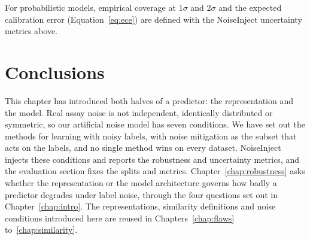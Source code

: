 For probabilistic models, empirical coverage at $1\sigma$ and $2\sigma$ and the expected calibration error (Equation~\ref{eq:ece}) are defined with the NoiseInject uncertainty metrics above.

\section{Conclusions}


This chapter has introduced both halves of a predictor: the representation and the model. Real assay noise is not independent, identically distributed or symmetric, so our artificial noise model has seven conditions. We have set out the methods for learning with noisy labels, with noise mitigation as the subset that acts on the labels, and no single method wins on every dataset. NoiseInject injects these conditions and reports the robustness and uncertainty metrics, and the evaluation section fixes the splits and metrics. Chapter~\ref{chap:robustness} asks whether the representation or the model architecture governs how badly a predictor degrades under label noise, through the four questions set out in Chapter~\ref{chap:intro}. The representations, similarity definitions and noise conditions introduced here are reused in Chapters~\ref{chap:flaws} to~\ref{chap:similarity}.

